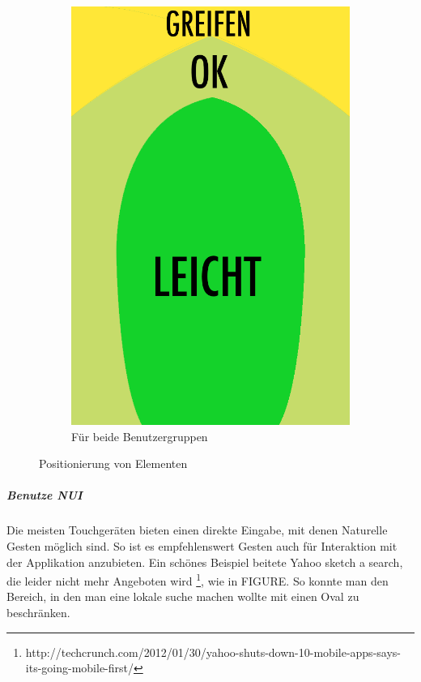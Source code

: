 \begin{figure}
\begin{subfigure}[b]{0.3\textwidth}
	\end{subfigure}
	\begin{subfigure}[b]{0.3\textwidth}
		\centering
			\includegraphics[width=1\textwidth]{img/anordungDerElementeForAll.png}
			\caption{Für beide Benutzergruppen}\label{fig:forallPositioning}
			
	\end{subfigure}
	\caption{Positionierung von Elementen}\label{fig:elementPos}
\end{figure}


\subparagraph{Benutze NUI} 
\label{subp:benutze_nui}

Die meisten Touchgeräten bieten einen direkte Eingabe, mit denen Naturelle Gesten möglich sind. So ist es empfehlenswert Gesten auch für Interaktion mit der Applikation anzubieten. Ein schönes Beispiel beitete Yahoo sketch a search, die leider nicht mehr Angeboten wird \footnote{http://techcrunch.com/2012/01/30/yahoo-shuts-down-10-mobile-apps-says-its-going-mobile-first/ }, wie in FIGURE. So konnte man den Bereich, in den man eine lokale suche machen wollte mit einen Oval zu beschränken.

